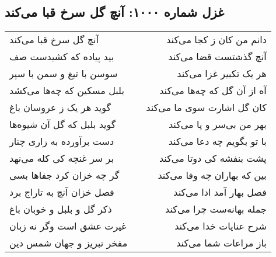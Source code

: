 \begin{center}
\section*{غزل شماره ۱۰۰۰: آنچ گل سرخ قبا می‌کند}
\label{sec:1000}
\begin{longtable}{l p{0.5cm} r}
آنچ گل سرخ قبا می‌کند
&&
دانم من کان ز کجا می‌کند
\\
بید پیاده که کشیدست صف
&&
آنچ گذشتست قضا می‌کند
\\
سوسن با تیغ و سمن با سپر
&&
هر یک تکبیر غزا می‌کند
\\
بلبل مسکین که چه‌ها می‌کشد
&&
آه از آن گل که چه‌ها می‌کند
\\
گوید هر یک ز عروسان باغ
&&
کان گل اشارت سوی ما می‌کند
\\
گوید بلبل که گل آن شیوه‌ها
&&
بهر من بی‌سر و پا می‌کند
\\
دست برآورده به زاری چنار
&&
با تو بگویم چه دعا می‌کند
\\
بر سر غنچه کی کله می‌نهد
&&
پشت بنفشه کی دوتا می‌کند
\\
گر چه خزان کرد جفاها بسی
&&
بین که بهاران چه وفا می‌کند
\\
فصل خزان آنچ به تاراج برد
&&
فصل بهار آمد ادا می‌کند
\\
ذکر گل و بلبل و خوبان باغ
&&
جمله بهانه‌ست چرا می‌کند
\\
غیرت عشق است وگر نه زبان
&&
شرح عنایات خدا می‌کند
\\
مفخر تبریز و جهان شمس دین
&&
باز مراعات شما می‌کند
\\
\end{longtable}
\end{center}
